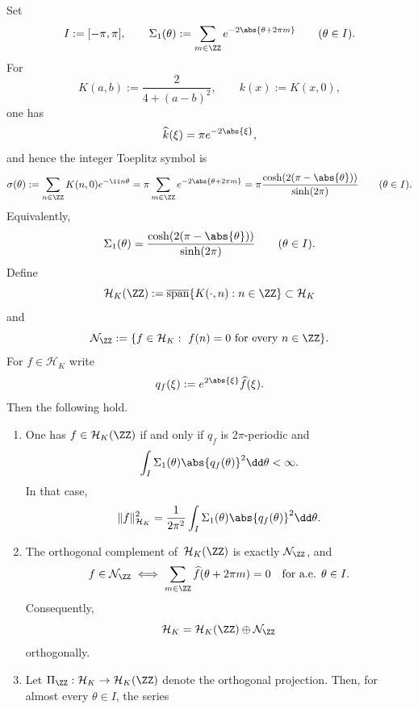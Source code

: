 \begin{lemma}%
\label{lem:auxiliary-uniform-lattice-projection}
Set
\[
I:=[-\pi,\pi],
\qquad
\Sigma_1(\theta):=\sum_{m\in\ZZ}e^{-2\abs{\theta+2\pi m}}
\qquad(\theta\in I).
\]
For
\[
K(a,b):=\frac{2}{4+(a-b)^2},
\qquad k(x):=K(x,0),
\]
one has
\[
\widehat k(\xi)=\pi e^{-2\abs{\xi}},
\]
and hence the integer Toeplitz symbol is
\begin{equation}\label{eq:integer-projection-poisson-symbol}
\sigma(\theta):=\sum_{n\in\ZZ}K(n,0)e^{-\ii n\theta}
=\pi\sum_{m\in\ZZ}e^{-2\abs{\theta+2\pi m}}
=\pi\frac{\cosh(2(\pi-\abs{\theta}))}{\sinh(2\pi)}
\qquad(\theta\in I).
\end{equation}
Equivalently,
\begin{equation}\label{eq:lattice-periodized-weight}
\Sigma_1(\theta)
=\frac{\cosh(2(\pi-\abs{\theta}))}{\sinh(2\pi)}
\qquad(\theta\in I).
\end{equation}
Define
\[
\mathcal H_K(\ZZ)
:=
\overline{\operatorname{span}}\{K(\cdot,n):n\in\ZZ\}
\subset\mathcal H_K
\]
and
\[
\mathcal N_{\ZZ}
:=
\{f\in\mathcal H_K:\ f(n)=0\ \text{for every }n\in\ZZ\}.
\]
For $f\in\mathcal H_K$ write
\[
q_f(\xi):=e^{2\abs{\xi}}\widehat f(\xi).
\]
Then the following hold.
\begin{enumerate}[label=(\roman*)]
\item
      One has $f\in\mathcal H_K(\ZZ)$ if and only if $q_f$ is
      $2\pi$-periodic and
      \[
      \int_I\Sigma_1(\theta)\abs{q_f(\theta)}^2\dd\theta<\infty.
      \]
      In that case,
      \begin{equation}\label{eq:lattice-subspace-norm}
      \|f\|_{\mathcal H_K}^2
      =\frac{1}{2\pi^2}\int_I\Sigma_1(\theta)\abs{q_f(\theta)}^2\dd\theta.
      \end{equation}
\item
      The orthogonal complement of~$\mathcal H_K(\ZZ)$ is exactly
      $\mathcal N_{\ZZ}$, and
      \begin{equation}\label{eq:lattice-alias-cancellation}
      f\in\mathcal N_{\ZZ}
      \iff
      \sum_{m\in\ZZ}\widehat f(\theta+2\pi m)=0
      \quad\text{for a.e. }\theta\in I.
      \end{equation}
      Consequently,
      \[
      \mathcal H_K=\mathcal H_K(\ZZ)\oplus \mathcal N_{\ZZ}
      \]
      orthogonally.
\item
      Let $\Pi_{\ZZ}:\mathcal H_K\to\mathcal H_K(\ZZ)$ denote the
      orthogonal projection.  Then, for almost every $\theta\in I$, the
      series

\end{enumerate}
\end{lemma}

